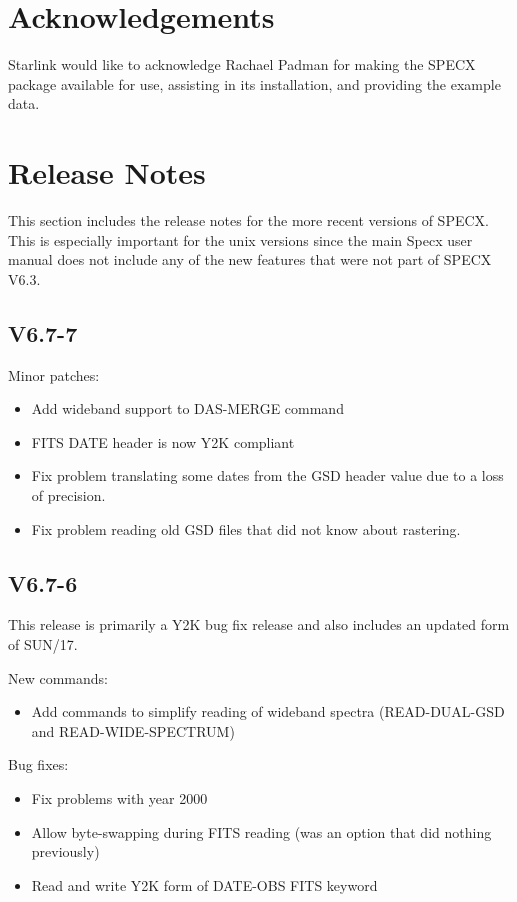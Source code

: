 \documentclass[twoside,11pt,nolof]{starlink}
\begin{document}
\section{Acknowledgements}

Starlink would like to acknowledge Rachael Padman for making
the SPECX package available for use, assisting in its installation,
and providing the example data.

\appendix

\section{Release Notes}

This section includes the release notes for the more recent versions
of SPECX. This is especially important for the unix versions since
the main Specx user manual does not include any of the new features
that were not part of SPECX V6.3.

\subsection{V6.7-7}

Minor patches:

\begin{itemize}
\item Add wideband support to DAS-MERGE command
\item FITS DATE header is now Y2K compliant
\item Fix problem translating some dates from the GSD header value due to a loss of  precision.
\item Fix problem reading old GSD files that did not know about rastering.
\end{itemize}

\subsection{V6.7-6}

This release is primarily a Y2K bug fix release and also includes an
updated form of SUN/17.

\begin{description}

\item New commands:
\begin{itemize}
\item Add commands to simplify reading of wideband spectra (READ-DUAL-GSD and
READ-WIDE-SPECTRUM)
\end{itemize}
\item Bug fixes:
\begin{itemize}
\item Fix problems with year 2000
\item Allow byte-swapping during FITS reading (was an option that
    did nothing previously)
\item Read and write Y2K form of DATE-OBS FITS keyword
\end{itemize}
\end{description}
\end{document}

